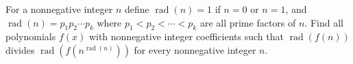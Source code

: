 For a nonnegative integer 
$n$
 define 
$\operatorname{rad}(n)=1$
 if 
$n=0$
 or 
$n=1$, 
 and 
$\operatorname{rad}(n)=p_1p_2\cdots p_k$
 where 
$p_1<p_2<\cdots <p_k$
 are all prime factors of 
$n$.
 Find all polynomials 
$f(x)$
 with nonnegative integer coefficients such that 
$\operatorname{rad}(f(n))$
 divides 
$\operatorname{rad}(f(n^{\operatorname{rad}(n)}))$
 for every nonnegative integer 
$n$.
